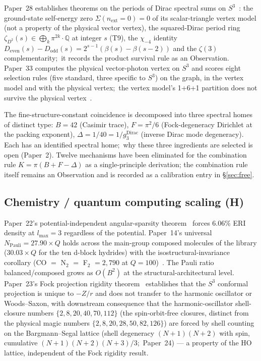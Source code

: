 \documentclass[11pt,a4paper]{article}
\theoremstyle{plain}
\theoremstyle{definition}
\newcommand{\lmax}{l_{\max}}
\newcommand{\sphere}[1]{S^{#1}}
\newcommand{\Q}{\mathbb{Q}}
\begin{document}
Paper~28 establishes theorems on the periods of Dirac spectral sums on $\sphere{3}$~\cite{paper28}:  the ground-state self-energy zero $\Sigma(n_{\mathrm{ext}}=0) = 0$ of its scalar-triangle vertex model (not a property of the physical vector vertex), the squared-Dirac period ring $\zeta_{D^2}(s) \in \bigoplus_k \pi^{2k} \cdot \Q$ at integer $s$ (T9), the $\chi_{-4}$ identity $D_{\mathrm{even}}(s) - D_{\mathrm{odd}}(s) = 2^{s-1}(\beta(s) - \beta(s-2))$ and the $\zeta(3)$ complementarity;\ it records the product survival rule as an Observation. Paper~33 computes the physical vector-photon vertex on $\sphere{3}$ and scores eight selection rules (five standard, three specific to $\sphere{3}$) on the graph, in the vertex model and with the physical vertex;\ the vertex model's 1+6+1 partition does not survive the physical vertex~\cite{paper33}.

The fine-structure-constant coincidence is decomposed into three spectral homes of distinct type:  $B = 42$ (Casimir trace), $F = \pi^2/6$ (Fock-degeneracy Dirichlet at the packing exponent), $\Delta = 1/40 = 1/g_3^{\mathrm{Dirac}}$ (inverse Dirac mode degeneracy). Each has an identified spectral home;\ why these three ingredients are selected is open (Paper~2). Twelve mechanisms have been eliminated for the combination rule $K = \pi(B + F - \Delta)$ as a single-principle derivation; the combination rule itself remains an Observation and is recorded as a calibration entry in \S\ref{sec:free}.

\subsection{Chemistry / quantum computing scaling (H)}
\label{sec:forced_chem}

Paper~22's potential-independent angular-sparsity theorem~\cite{paper22} forces 6.06\% ERI density at $\lmax = 3$ regardless of the potential. Paper~14's universal $N_{\mathrm{Pauli}} = 27.90 \times Q$ holds across the main-group composed molecules of the library ($30.03 \times Q$ for the ten d-block hydrides) with the isostructural-invariance corollary (CO $=$ N$_2$ $=$ F$_2$ $= 2{,}790$ at $Q = 100$)~\cite{paper14}. The Pauli ratio balanced/composed grows as $O(B^2)$ at the structural-architectural level. Paper~23's Fock projection rigidity theorem~\cite{paper23} establishes that the $\sphere{3}$ conformal projection is unique to $-Z/r$ and does not transfer to the harmonic oscillator or Woods--Saxon, with downstream consequence that the harmonic-oscillator shell-closure numbers $\{2, 8, 20, 40, 70, 112\}$ (the spin-orbit-free closures, distinct from the physical magic numbers $\{2, 8, 20, 28, 50, 82, 126\}$) are forced by shell counting on the Bargmann--Segal lattice (shell degeneracy $(N+1)(N+2)$ with spin, cumulative $(N+1)(N+2)(N+3)/3$;\ Paper~24) --- a property of the HO lattice, independent of the Fock rigidity result.
\end{document}
